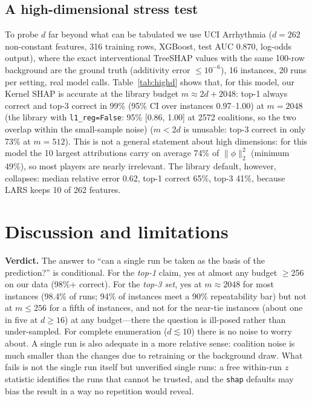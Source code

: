 \documentclass{article}
\begin{document}
\subsection{A high-dimensional stress test}\label{sec:highd}
To probe $d$ far beyond what can be tabulated we use UCI Arrhythmia \citep{arrhythmia} ($d{=}262$ non-constant features, 316 training rows, XGBoost, test AUC 0.870, log-odds output), where the exact interventional TreeSHAP values with the same 100-row background are the ground truth (additivity error $\le10^{-6}$), 16 instances, 20 runs per setting, real model calls. Table~\ref{tab:highd} shows that, for this model, our Kernel SHAP is accurate at the library budget $m{\approx}2d{+}2048$: top-1 always correct and top-3 correct in 99\% (95\% CI over instances 0.97--1.00) at $m=2048$ (the library with \texttt{l1\_reg=False}: 95\% [0.86, 1.00] at 2572 coalitions, so the two overlap within the small-sample noise) ($m<2d$ is unusable: top-3 correct in only 73\% at $m=512$). This is not a general statement about high dimensions: for this model the 10 largest attributions carry on average 74\% of $\|\phi\|_2^2$ (minimum 49\%), so most players are nearly irrelevant. The library default, however, collapses: median relative error 0.62, top-1 correct 65\%, top-3 41\%, because LARS keeps 10 of 262 features.
\begin{table}[t]
\centering\scriptsize

\caption{Arrhythmia ($d{=}262$): comparison with exact TreeSHAP; 16 instances, mean over instances with 95\% bootstrap CI.}\label{tab:highd}
\end{table}

\section{Discussion and limitations}
\textbf{Verdict.} The answer to ``can a single run be taken as the basis of the prediction?'' is conditional. For the \emph{top-1} claim, yes at almost any budget $\ge$256 on our data (98\%+ correct). For the \emph{top-3 set}, yes at $m\approx2048$ for most instances (98.4\% of runs; 94\% of instances meet a 90\% repeatability bar) but not at $m\le256$ for a fifth of instances, and not for the near-tie instances (about one in five at $d\ge16$) at any budget---there the question is ill-posed rather than under-sampled. For complete enumeration ($d\lesssim10$) there is no noise to worry about. A single run is also adequate in a more relative sense: coalition noise is much smaller than the changes due to retraining or the background draw. What fails is not the single run itself but unverified single runs: a free within-run $z$ statistic identifies the runs that cannot be trusted, and the \texttt{shap} defaults may bias the result in a way no repetition would reveal.
\end{document}
